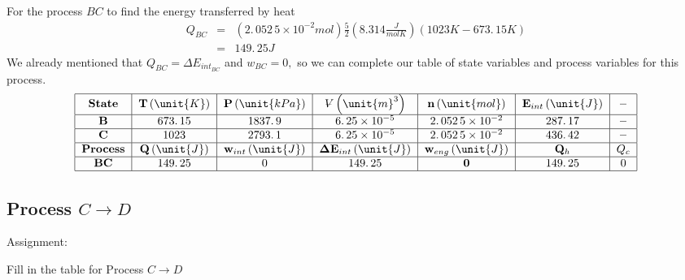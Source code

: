 \documentclass{article}
\begin{document}
For the process $BC$ to find the energy transferred by heat%
\begin{eqnarray*}
Q_{BC} &=&\left( 2.\,052\,5\times 10^{-2}\unit{mol}\right) \frac{5}{2}\left(
8.314\frac{\unit{J}}{\unit{mol}\unit{K}}\right) \left( 1023\unit{K}%
-673.\,\allowbreak 15\unit{K}\right) \\
&=&149.\,\allowbreak 25\unit{J}
\end{eqnarray*}%
We already mentioned that $Q_{BC}=\Delta E_{int_{BC}}$ and $w_{BC}=0,$ so we
can complete our table of state variables and process variables for this
process. 
\[
\begin{tabular}{|c|c|c|c|c|c|c|}
\hline
\textbf{State} & $\mathbf{T}\left( \unit{K}\right) $ & $\mathbf{P}\left( 
\unit{kPa}\right) $ & $%
\ooalign{\hfil$V$\hfil\cr\kern0.1em--\hfil\cr}%
\left( \unit{m}^{3}\right) $ & $\mathbf{n}\left( \unit{mol}\right) $ & $%
\mathbf{E}_{int}\left( \unit{J}\right) $ & \textbf{--} \\ \hline
$\mathbf{B}$ & $673.\,\allowbreak 15$ & $\allowbreak 1837.\,\allowbreak 9$ & 
$6.\,25\times 10^{-5}$ & $2.\,052\,5\times 10^{-2}$ & $287.\,\allowbreak 17$
& \textbf{--} \\ \hline
$\mathbf{C}$ & $1023$ & $2793.\,\allowbreak 1$ & $6.\,25\times 10^{-5}$ & $%
2.\,052\,5\times 10^{-2}$ & $436.\,\allowbreak 42$ & \textbf{--} \\ \hline
\textbf{Process} & $\mathbf{Q}\left( \unit{J}\right) $ & $\mathbf{w}%
_{int}\left( \unit{J}\right) $ & $\mathbf{\Delta E}_{int}\left( \unit{J}%
\right) $ & $\mathbf{w}_{eng}\left( \unit{J}\right) $ & $\mathbf{Q}_{h}$ & $%
Q_{c}$ \\ \hline
$\mathbf{BC}$ & $149.\,\allowbreak 25$ & $0$ & $149.\,\allowbreak 25$ & $%
\mathbf{0}$ & $149.\,\allowbreak 25$ & $0$ \\ \hline
\end{tabular}%
\]%
\pagebreak

\subsection{\textbf{Process }$C\rightarrow D$}

Assignment:

Fill in the table for Process $C\rightarrow D$
\end{document}
